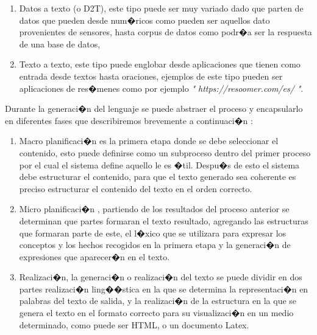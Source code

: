 \begin{enumerate}

\item Datos a texto (o D2T), este tipo puede ser muy variado dado que parten de datos que pueden desde num�ricos como pueden ser aquellos dato provenientes de sensores, hasta corpus de datos como podr�a ser la respuesta de una base de datos,  
\item Texto a texto, este tipo puede englobar desde aplicaciones que tienen como entrada desde textos hasta oraciones, ejemplos de este tipo pueden ser aplicaciones de res�menes como por ejemplo \textit{" https://resoomer.com/es/ "}.

\end{enumerate}

Durante la generaci�n del lenguaje se puede abstraer el proceso y encapsularlo en diferentes fases que describiremos brevemente a continuaci�n \citep{VICENTE2015}:


\begin{enumerate}

\item Macro planificaci�n es la primera etapa donde se debe seleccionar el contenido,  esto puede definirse como un subproceso dentro del primer proceso  por el cual el sistema define aquello le es �til. Despu�s de esto el sistema debe estructurar el contenido, para que el texto generado sea coherente es preciso estructurar el contenido del texto en el orden correcto.
\item Micro planificaci�n , partiendo de los resultados del proceso anterior  se determinan que partes formaran el texto resultado, agregando las estructuras que formaran parte de este, el l�xico que se utilizara para expresar los conceptos y los hechos recogidos en la primera etapa y la generaci�n de expresiones que aparecer�n en el texto.  
\item Realizaci�n, la generaci�n o realizaci�n del texto se puede dividir en dos partes realizaci�n ling��stica en la que se determina la representaci�n en palabras del texto de salida, y la realizaci�n de la estructura en la que se genera el texto en el formato correcto para su visualizaci�n en un medio determinado, como puede ser HTML, o un documento Latex.

\end{enumerate}


